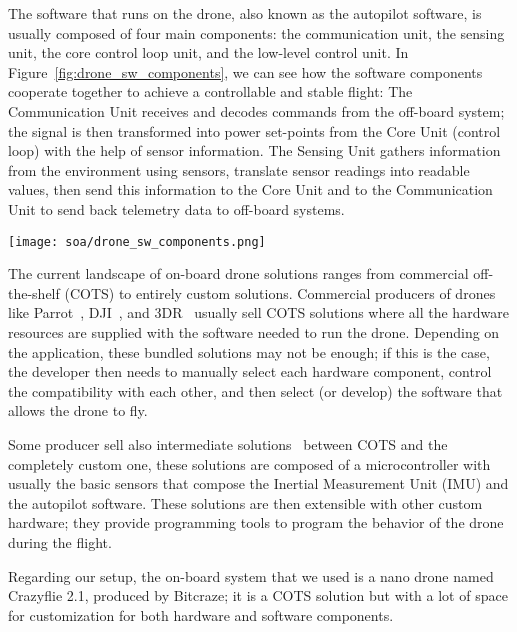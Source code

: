 The software that runs on the drone, also known as the autopilot software, is usually composed of four main components: the communication unit, the sensing unit, the core control loop unit, and the low-level control unit. 
In Figure~\ref{fig:drone_sw_components}, we can see how the software components cooperate together to achieve a controllable and stable flight:
The Communication Unit receives and decodes commands from the off-board system; the signal is then transformed into power set-points from the Core Unit (control loop) with the help of sensor information. 
The Sensing Unit gathers information from the environment using sensors, translate 
sensor readings into readable values, then send this information to the Core Unit and to the Communication Unit to send back telemetry data to off-board systems.

\begin{SCfigure}[\sidecaptionrelwidth][h]
    \texttt{[image: soa/drone\_sw\_components.png]}
    \caption[Drone software components]{
        The main software components of a drone are: 
        the \textit{Sensing Unit}, the \textit{Communication Unit} and the \textit{Core Unit (control loop)}.
    }\label{fig:drone_sw_components}
\end{SCfigure}

The current landscape of on-board drone solutions ranges from commercial off-the-shelf (COTS) to entirely custom solutions.
Commercial producers of drones like Parrot~\cite{parrot}, DJI~\cite{dij}, and 3DR~\cite{3DR} usually sell COTS solutions where all the hardware resources are supplied
with the software needed to run the drone.
Depending on the application, these bundled solutions may not be enough; if this is the case, 
the developer then needs to manually select each hardware component, control the compatibility with each other, 
and then select (or develop) the software that allows the drone to fly.

Some producer sell also intermediate solutions~\cite{pixhawk, px4, cube, navio2} between COTS and the completely custom one, 
these solutions are composed of a microcontroller with usually the basic sensors that compose the 
Inertial Measurement Unit (IMU) and the autopilot software. 
These solutions are then extensible with other custom hardware; they provide programming tools to program the 
behavior of the drone during the flight.

Regarding our setup, the on-board system that we used is a nano drone named Crazyflie 2.1, produced by Bitcraze; 
it is a COTS solution but with a lot of space for customization for both hardware and software components.

